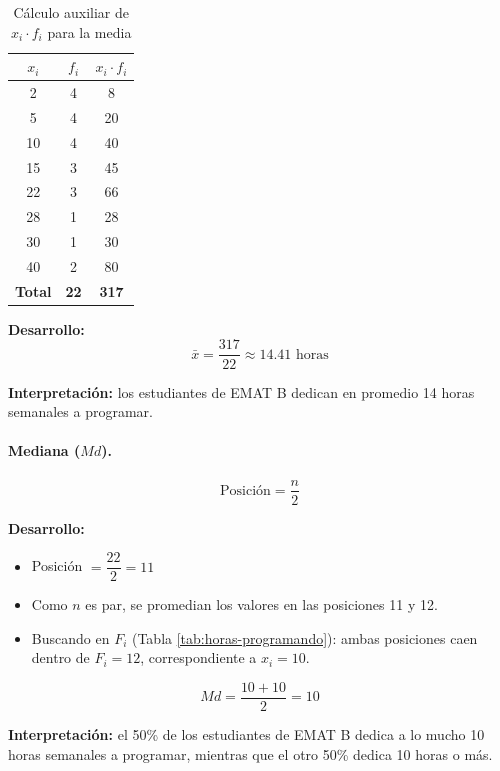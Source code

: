 \documentclass[12pt,letterpaper]{article}
\begin{document}
\begin{table}[H]
    \centering
    \caption{Cálculo auxiliar de $x_i \cdot f_i$ para la media}
    \vspace{1em}
    \label{tab:aux-media}
    \begin{tabular}{@{}ccc@{}}
        \toprule
        $x_i$ & $f_i$ & $x_i \cdot f_i$ \\
        \midrule
        2  & 4 & 8 \\
        5  & 4 & 20 \\
        10 & 4 & 40 \\
        15 & 3 & 45 \\
        22 & 3 & 66 \\
        28 & 1 & 28 \\
        30 & 1 & 30 \\
        40 & 2 & 80 \\
        \midrule
        \textbf{Total} & \textbf{22} & \textbf{317} \\
        \bottomrule
    \end{tabular}
\end{table}

\noindent\textbf{Desarrollo:}
$$\bar{x} = \frac{317}{22} \approx 14.41 \text{ horas}$$

\noindent\textbf{Interpretación:} los estudiantes de EMAT B dedican en promedio 14 horas semanales a programar.

\paragraph{Mediana ($Md$).}
$$\text{Posición} = \frac{n}{2}$$

\noindent\textbf{Desarrollo:}
\begin{itemize}[nosep]
    \item Posición $= \dfrac{22}{2} = 11$
    \item Como $n$ es par, se promedian los valores en las posiciones 11 y 12.
    \item Buscando en $F_i$ (Tabla \ref{tab:horas-programando}): ambas posiciones caen dentro de $F_i = 12$, correspondiente a $x_i = 10$.
\end{itemize}
$$Md = \frac{10 + 10}{2} = 10$$

\noindent\textbf{Interpretación:} el 50\% de los estudiantes de EMAT B dedica a lo mucho 10 horas semanales a programar, mientras que el otro 50\% dedica 10 horas o más.

\end{document}
